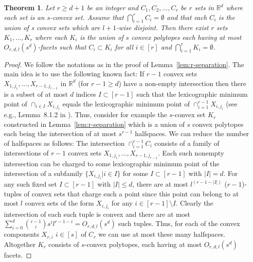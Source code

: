 \documentclass[11pt]{article}
\def\Re{\mathbb R}
\theoremstyle{plain}
\newtheorem{theorem}{Theorem}[section]
\theoremstyle{definition}
\theoremstyle{remark}
\begin{document}
 \begin{theorem}
 \label{thm:l+1-wise}
     Let $r \geq d+1$ be an integer and $C_1,C_2,\ldots,C_r$ be $r$ sets in $\Re^d$ where each set is an
 $s$-convex set.  Assume that $\bigcap_{i=1}^r C_i= \emptyset$ and that each $C_i$ is the union of s convex sets which are $l+1$-wise disjoint.  Then there
 exist $r$ sets $K_1,\ldots, K_r$ where each $K_i$ is the union of $s$
 convex polytopes each having at most $O_{r,d,l}(s^d)$-facets such 
	 that $C_i
 \subset K_i$ for all $i \in [r]$ and $\bigcap_{i=1}^r K_i = \emptyset$.
 \end{theorem}
 
 \begin{proof}
     
 We follow the notations as in the proof of Lemma~\ref{lem:r-separation}. The main idea is to use the following known fact: If $r-1$ convex 
	 sets $X_{1,j_1},\ldots, X_{r-1,j_{r-1}}$ in $\Re^d$ (for $r-1 \geq d$) have a non-empty intersection then there is a subset of at most $d$ indices $I \subset [r-1]$ such that the 
	 lexicographic minimum point of $\cap _{i \in I} X_{i,j_i}$ equals the lexicographic minimum point of  $\cap_{i=1}^{r-1} X_{i,j_i}$ (see e.g., Lemma~8.1.2 in \cite{MATOUSEK}). Thus, consider 
	 for example the $s$-convex set $K_r$ constructed in 
	 Lemma~\ref{lem:r-separation} which is a union of $s$ convex 
	 polytopes each being the intersection of at most $s^{r-1}$ 
	 halfspaces. We can reduce the number of halfspaces as follows: 
	 The intersection $\cap_{i=1}^{r-1} C_i$ consists of a family of intersections of $r-1$ convex sets $X_{1,j_1},\ldots,X_{r-1,j_{r-1}}$. 
	Each such nonempty intersection can be charged to some 
	 lexicographic minimum point of the intersection of a 
	 subfamily $\{X_{i,j_i}| i \in  I\}$ for some $I \subset [r-1]$ with $|I|=d$. For any such fixed set $I \subset [r-1]$ with $|I| \leq d$, there are at most $l^{(r-1-|I|)}$ ($r-1$)-tuples of 
	 convex sets that charge such a point since this point can 
	 belong to at most $l$ convex sets of the form $X_{i,j_i}$ 
	 for any $i \in [r-1]\setminus I$.  Clearly the intersection 
	 of each such tuple is convex and there are at most 
	 $\sum_{i=0}^d {r-1 \choose i} s^il^{r-1-i} = O_{r,d,l}(s^d)$ 
	 such tuples. Thus, for each of the convex components 
	 $X_{r,i}$ $i \in [s]$ of $C_r$ we can use at most these 
	 many halfspaces. Altogether $K_r$ consists of $s$-convex 
	 polytopes, each having at most  $O_{r,d,l}(s^{d})$ facets. 
\end{proof}
\end{document}
